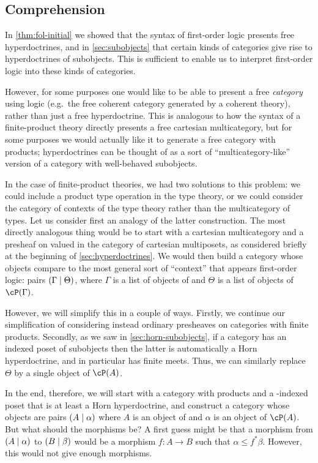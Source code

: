 \begin{wip}
\section{Comprehension}
\label{sec:comprehension}

In \cref{thm:fol-initial} we showed that the syntax of first-order logic presents free hyperdoctrines, and in \cref{sec:subobjects} that certain kinds of categories give rise to hyperdoctrines of subobjects.
This is sufficient to enable us to interpret first-order logic into these kinds of categories.

However, for some purposes one would like to be able to present a free \emph{category} using logic (e.g.\ the free coherent category generated by a coherent theory), rather than just a free hyperdoctrine.
This is analogous to how the syntax of a finite-product theory directly presents a free cartesian multicategory, but for some purposes we would actually like it to generate a free category with products; hyperdoctrines can be thought of as a sort of ``multicategory-like'' version of a category with well-behaved subobjects.

In the case of finite-product theories, we had two solutions to this problem: we could include a product type operation in the type theory, or we could consider the category of contexts of the type theory rather than the multicategory of types.
Let us consider first an analogy of the latter construction.
The most directly analogous thing would be to start with a cartesian multicategory \bS and a presheaf \cP on \bS valued in the category of cartesian multiposets, as considered briefly at the beginning of \cref{sec:hyperdoctrines}.
We would then build a category whose objects compare to the most general sort of ``context'' that appears first-order logic: pairs $(\Gamma\mid\Theta)$, where $\Gamma$ is a list of objects of \cS and $\Theta$ is a list of objects of $\cP(\Gamma)$.

However, we will simplify this in a couple of ways.
Firstly, we continue our simplification of considering instead ordinary presheaves on categories \cS with finite products.
Secondly, as we saw in \cref{sec:horn-subobjects}, if a category has an indexed poset of subobjects then the latter is automatically a Horn hyperdoctrine, and in particular has finite meets.
Thus, we can similarly replace $\Theta$ by a single object of $\cP(A)$.

In the end, therefore, we will start with a category \cS with products and a \cS-indexed poset \cP that is at least a Horn hyperdoctrine, and construct a category whose objects are pairs $(A\mid\alpha)$ where $A$ is an object of \cS and $\alpha$ is an object of $\cP(A)$.
But what should the morphisms be?
A first guess might be that a morphism from $(A\mid\alpha)$ to $(B\mid\beta)$ would be a morphism $f:A\to B$ such that $\alpha \le f^*\beta$.
However, this would not give enough morphisms.


\end{wip}
